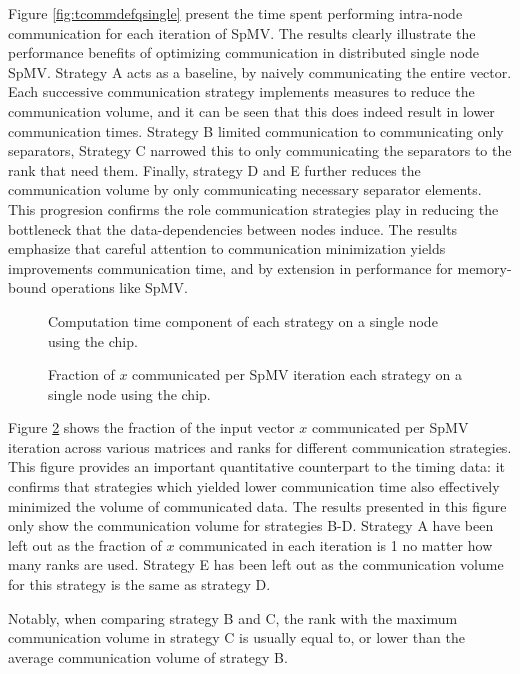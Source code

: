 Figure \ref{fig:tcommdefqsingle} present the time spent performing intra-node communication for each iteration of SpMV. The results clearly illustrate the performance benefits of optimizing communication in distributed single node SpMV. Strategy A acts as a baseline, by naively communicating the entire vector. Each successive communication strategy implements measures to reduce the communication volume, and it can be seen that this does indeed result in lower communication times. Strategy B limited communication to communicating only separators, Strategy C narrowed this to only communicating the separators to the rank that need them. Finally, strategy D and E further reduces the communication volume by only communicating necessary separator elements. This progresion confirms the role communication strategies play in reducing the bottleneck that the data-dependencies between nodes induce. The results emphasize that careful attention to communication minimization yields improvements communication time, and by extension in performance for memory-bound operations like SpMV.

\begin{figure}[H]
    \centering
    \caption{Computation time component of each strategy on a single node using the  chip.}
    \label{fig:tcompdefqsingle}
\end{figure}

\begin{figure}[H]
    \centering
    \caption{Fraction of \(x\) communicated per SpMV iteration each strategy on a single node using the  chip.}
    \label{fig:commloaddefqsingle}
\end{figure}
Figure \ref{fig:commloaddefqsingle} shows the fraction of the input vector \(x\) communicated per SpMV iteration across various matrices and ranks for different communication strategies. This figure provides an important quantitative counterpart to the timing data: it confirms that strategies which yielded lower communication time also effectively minimized the volume of communicated data. The results presented in this figure only show the communication volume for strategies B-D. Strategy A have been left out as the fraction of \(x\) communicated in each iteration is 1 no matter how many ranks are used. Strategy E has been left out as the communication volume for this strategy is the same as strategy D.
\medskip

Notably, when comparing strategy B and C, the rank with the maximum communication volume in strategy C is usually equal to, or lower than the average communication volume of strategy B.


